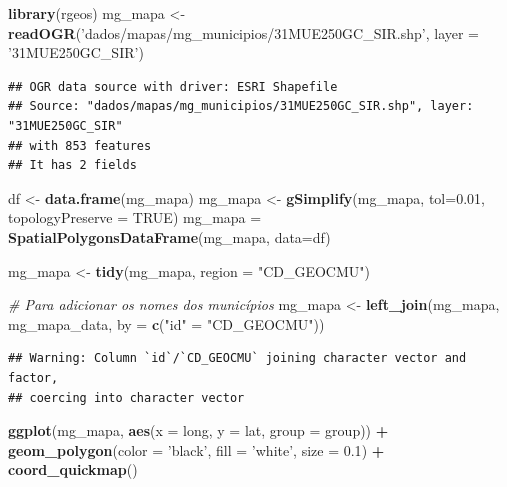 \documentclass[]{book}
\newenvironment{Shaded}{\begin{snugshade}}{\end{snugshade}}
\newcommand{\KeywordTok}[1]{\textcolor[rgb]{0.13,0.29,0.53}{\textbf{#1}}}
\newcommand{\DataTypeTok}[1]{\textcolor[rgb]{0.13,0.29,0.53}{#1}}
\newcommand{\FloatTok}[1]{\textcolor[rgb]{0.00,0.00,0.81}{#1}}
\newcommand{\StringTok}[1]{\textcolor[rgb]{0.31,0.60,0.02}{#1}}
\newcommand{\CommentTok}[1]{\textcolor[rgb]{0.56,0.35,0.01}{\textit{#1}}}
\newcommand{\OtherTok}[1]{\textcolor[rgb]{0.56,0.35,0.01}{#1}}
\newcommand{\OperatorTok}[1]{\textcolor[rgb]{0.81,0.36,0.00}{\textbf{#1}}}
\newcommand{\NormalTok}[1]{#1}
\begin{document}
\begin{Shaded}
\begin{Highlighting}[]
\KeywordTok{library}\NormalTok{(rgeos)}
\NormalTok{mg_mapa <-}\StringTok{ }\KeywordTok{readOGR}\NormalTok{(}\StringTok{'dados/mapas/mg_municipios/31MUE250GC_SIR.shp'}\NormalTok{,}
                   \DataTypeTok{layer =} \StringTok{'31MUE250GC_SIR'}\NormalTok{)}
\end{Highlighting}
\end{Shaded}

\begin{verbatim}
## OGR data source with driver: ESRI Shapefile 
## Source: "dados/mapas/mg_municipios/31MUE250GC_SIR.shp", layer: "31MUE250GC_SIR"
## with 853 features
## It has 2 fields
\end{verbatim}

\begin{Shaded}
\begin{Highlighting}[]
\NormalTok{df <-}\StringTok{ }\KeywordTok{data.frame}\NormalTok{(mg_mapa)}
\NormalTok{mg_mapa <-}\StringTok{ }\KeywordTok{gSimplify}\NormalTok{(mg_mapa, }\DataTypeTok{tol=}\FloatTok{0.01}\NormalTok{, }\DataTypeTok{topologyPreserve =} \OtherTok{TRUE}\NormalTok{)}
\NormalTok{mg_mapa =}\StringTok{ }\KeywordTok{SpatialPolygonsDataFrame}\NormalTok{(mg_mapa, }\DataTypeTok{data=}\NormalTok{df)}

\NormalTok{mg_mapa <-}\StringTok{ }\KeywordTok{tidy}\NormalTok{(mg_mapa, }\DataTypeTok{region =} \StringTok{"CD_GEOCMU"}\NormalTok{)}

\CommentTok{# Para adicionar os nomes dos municípios}
\NormalTok{mg_mapa <-}\StringTok{ }\KeywordTok{left_join}\NormalTok{(mg_mapa, mg_mapa_data, }\DataTypeTok{by =} \KeywordTok{c}\NormalTok{(}\StringTok{"id"}\NormalTok{ =}\StringTok{ "CD_GEOCMU"}\NormalTok{))}
\end{Highlighting}
\end{Shaded}

\begin{verbatim}
## Warning: Column `id`/`CD_GEOCMU` joining character vector and factor,
## coercing into character vector
\end{verbatim}

\begin{Shaded}
\begin{Highlighting}[]
\KeywordTok{ggplot}\NormalTok{(mg_mapa, }\KeywordTok{aes}\NormalTok{(}\DataTypeTok{x =}\NormalTok{ long, }\DataTypeTok{y =}\NormalTok{ lat, }\DataTypeTok{group =}\NormalTok{ group)) }\OperatorTok{+}
\StringTok{  }\KeywordTok{geom_polygon}\NormalTok{(}\DataTypeTok{color =} \StringTok{'black'}\NormalTok{, }\DataTypeTok{fill =} \StringTok{'white'}\NormalTok{, }\DataTypeTok{size =} \FloatTok{0.1}\NormalTok{) }\OperatorTok{+}
\StringTok{  }\KeywordTok{coord_quickmap}\NormalTok{()}
\end{Highlighting}
\end{Shaded}
\end{document}
